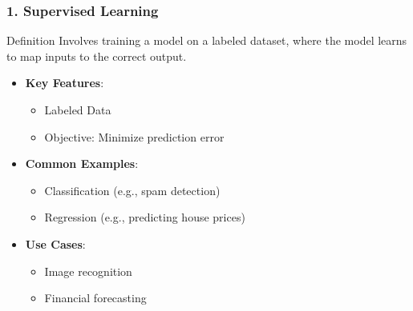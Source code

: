 \documentclass[aspectratio=169]{beamer}
\begin{document}
\begin{frame}[fragile]
    \frametitle{1. Supervised Learning}
    \begin{block}{Definition}
        Involves training a model on a labeled dataset, where the model learns to map inputs to the correct output.
    \end{block}
    
    \begin{itemize}
        \item \textbf{Key Features}:
            \begin{itemize}
                \item Labeled Data
                \item Objective: Minimize prediction error
            \end{itemize}
        
        \item \textbf{Common Examples}:
            \begin{itemize}
                \item Classification (e.g., spam detection)
                \item Regression (e.g., predicting house prices)
            \end{itemize}

        \item \textbf{Use Cases}:
            \begin{itemize}
                \item Image recognition
                \item Financial forecasting
            \end{itemize}
    \end{itemize}
\end{frame}
\end{document}
